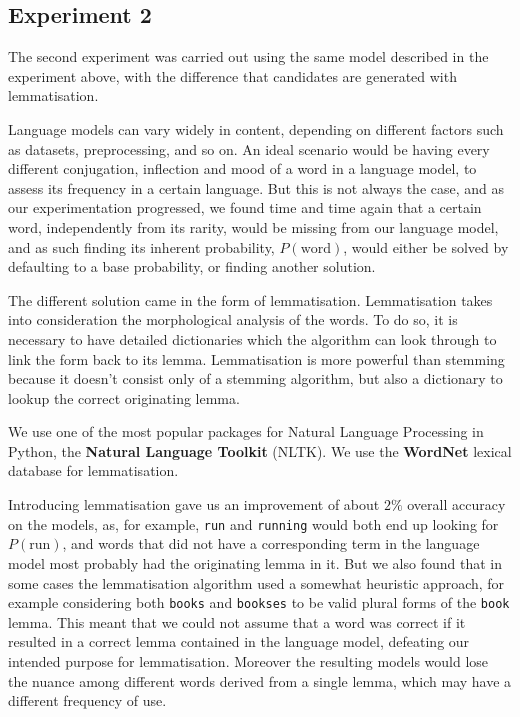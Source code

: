 \subsection{Experiment 2}
The second experiment was carried out using the same model described in the experiment above, with the 
difference that candidates are generated with lemmatisation.  

Language models can vary widely in content, depending on different factors such as datasets, preprocessing, and 
so on. An ideal scenario would be having every different conjugation, inflection and mood of a word in a language 
model, to assess its frequency in a certain language. But this is not always the case, and as our experimentation 
progressed, we found time and time again that a certain word, independently from its rarity, would be missing 
from our language model, and as such finding its inherent probability, $P(\mbox{word})$, would either be solved 
by defaulting to a base probability, or finding another solution.

The different solution came in the form of lemmatisation.
Lemmatisation takes into consideration the morphological analysis of the words. To do so, it is necessary to have 
detailed dictionaries which the algorithm can look through to link the form back to its lemma. Lemmatisation is 
more powerful than stemming because it doesn't consist only of a stemming algorithm, but also a dictionary to 
lookup the correct originating lemma.

We use one of the most popular packages for Natural Language Processing in Python, the \textbf{Natural 
Language Toolkit} (NLTK). We use the \textbf{WordNet} lexical database for lemmatisation.

Introducing lemmatisation gave us an improvement of about $2\%$ overall accuracy on the models, as, for example, 
\texttt{run} and \texttt{running} would both end up looking for $P(\mbox{run})$, and words that did not have a 
corresponding term in the language model most probably had the originating lemma in it. But we also found that in some 
cases the lemmatisation algorithm used a somewhat heuristic approach, for example considering both \texttt{books} and 
\texttt{bookses} to be valid plural forms of the \texttt{book} lemma. This meant that we could not assume that a word 
was correct if it resulted in a correct lemma contained in the language model, defeating our intended purpose for 
lemmatisation. Moreover the resulting models would lose the nuance among different words derived from a single lemma, 
which may have a different frequency of use.

